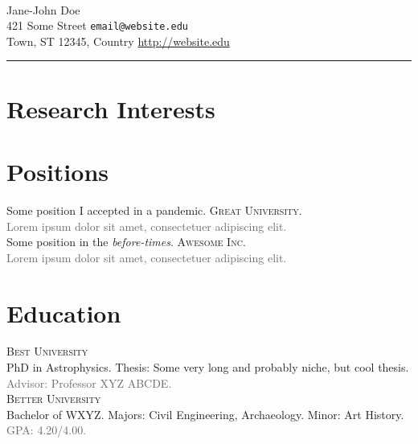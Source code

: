 \documentclass[12pt]{article}
\newcommand{\smallitem}[1]{\small\textcolor{dimgray}{#1}}
\begin{document}
\begin{leftsideheader}
\begin{flushleft}
    \hfill{\updateinfo} \\
    
    {\huge Jane-John Doe} \\[5pt]
    
    421 Some Street \hfill \texttt{email@website.edu} \\
    
    Town, ST 12345, Country \hfill \url{http://website.edu}
\end{flushleft}
{\centering\rule{7.4in}{1pt}\par}
\end{leftsideheader}

\section{Research Interests}
\lipsum[75]


\section{Positions}
Some position I accepted in a pandemic. \textsc{Great University}. \\
\smallitem{Lorem ipsum dolor sit amet, consectetuer adipiscing elit.}\\

Some position in the \textit{before-times}. \textsc{Awesome Inc.} \\
\smallitem{Lorem ipsum dolor sit amet, consectetuer adipiscing elit.}

\section{Education}
\textsc{Best University} \\ 
PhD in Astrophysics. Thesis: Some very long and probably niche, but cool thesis.\\
\smallitem{Advisor: Professor XYZ ABCDE.}\\

\textsc{Better University} \\
Bachelor of WXYZ. Majors: Civil Engineering, Archaeology. Minor: Art History.\\
\smallitem{GPA: 4.20/4.00.}
\end{document}
